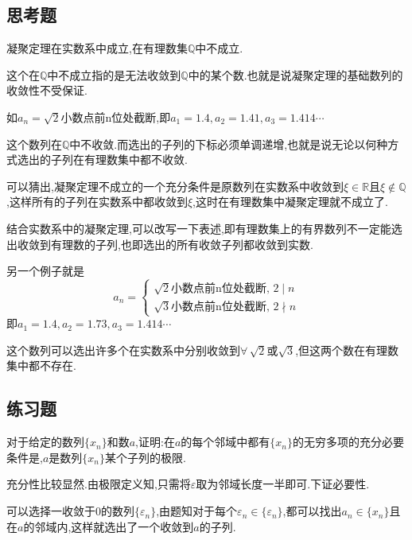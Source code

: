 \documentclass[cn,chinese,fontset]{elegantbook}
\begin{document}
  \subsection{思考题}
      \begin{example}
          凝聚定理在实数系中成立,在有理数集$\mathbb{Q} $中不成立.
      \end{example}
      \begin{solution}
          这个在$\mathbb{Q}$中不成立指的是无法收敛到$\mathbb{Q}$中的某个数.也就是说凝聚定理的基础数列的收敛性不受保证.

          如$a_n=\sqrt{2}$小数点前n位处截断,即$a_1=1.4,a_2=1.41,a_3=1.414\cdots$

          这个数列在$\mathbb{Q}$中不收敛.而选出的子列的下标必须单调递增,也就是说无论以何种方式选出的子列在有理数集中都不收敛.

          可以猜出,凝聚定理不成立的一个充分条件是原数列在实数系中收敛到$\xi\in\mathbb{R}$且$\xi\notin\mathbb{Q}$,这样所有的子列在实数系中都收敛到$\xi$,这时在有理数集中凝聚定理就不成立了.

          结合实数系中的凝聚定理,可以改写一下表述,即有理数集上的有界数列不一定能选出收敛到有理数的子列,也即选出的所有收敛子列都收敛到实数.

          另一个例子就是
          \[
              a_n=
              \begin{cases}
                  \sqrt{2}\text{小数点前n位处截断},\, 2\mid  n \\
                  \sqrt{3}\text{小数点前n位处截断},\, 2\nmid n
              \end{cases}
          \]
          即$a_1=1.4,a_2=1.73,a_3=1.414\cdots$

          这个数列可以选出许多个在实数系中分别收敛到$\forall\, \sqrt{2}$或$\sqrt{3}$,但这两个数在有理数集中都不存在.
      \end{solution}
  \subsection{练习题}
      \begin{exercise}
          对于给定的数列$\{x_n\}$和数$a$,证明:在$a$的每个邻域中都有$\{x_n\}$的无穷多项的充分必要条件是,$a$是数列$\{x_n\}$某个子列的极限.
      \end{exercise}
      \begin{solution}
          充分性比较显然.由极限定义知,只需将$\varepsilon$取为邻域长度一半即可.下证必要性.

          可以选择一收敛于0的数列$\{\varepsilon_n\}$,由题知对于每个$\varepsilon_n\in\{\varepsilon_n\}$,都可以找出$a_n\in\{x_n\}$且在$a$的邻域内,这样就选出了一个收敛到$a$的子列.
      \end{solution}
\end{document}

